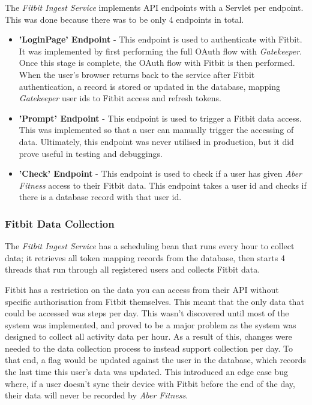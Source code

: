 The \textit{Fitbit Ingest Service} implements API endpoints with a Servlet per endpoint. This was done because there was to be only 4 endpoints in total.

\begin{itemize}
	\item \textbf{'LoginPage' Endpoint} - This endpoint is used to authenticate with Fitbit. It was implemented by first performing the full OAuth flow with \textit{Gatekeeper}. Once this stage is complete, the OAuth flow with Fitbit is then performed. When the user's browser returns back to the service after Fitbit authentication, a record is stored or updated in the database, mapping
	\textit{Gatekeeper} user ids to Fitbit access and refresh tokens.

	\item \textbf{'Prompt' Endpoint} - This endpoint is used to trigger a Fitbit data access. This was implemented so that a user can manually trigger the accessing of data. Ultimately, this endpoint was never utilised in production, but it did prove useful in testing and debuggings.

	\item \textbf{'Check' Endpoint} - This endpoint is used to check if a user has given \textit{Aber Fitness} access to their Fitbit data. This endpoint takes a user id and checks if there is a database record with that user id.
\end{itemize}

\subsubsection{Fitbit Data Collection}

The \textit{Fitbit Ingest Service} has a scheduling bean that runs every hour to collect data; it retrieves all token mapping records from the database, then starts 4 threads that run through all registered users and collects Fitbit data.

Fitbit has a restriction on the data you can access from their API without specific authorisation from Fitbit themselves. This meant that the only data that could be accessed was steps per day. This wasn't discovered until most of the system was implemented, and proved to be a major problem as the system was designed to collect all activity data per hour. As a result of this, changes were needed to the data collection process to instead support collection per day. To that end, a flag would be updated against the user in the database, which records the last time this user's data was updated. This introduced an edge case bug where, if a user doesn't sync their device with Fitbit before the end of the day, their data will never be recorded by \textit{Aber Fitness}.


